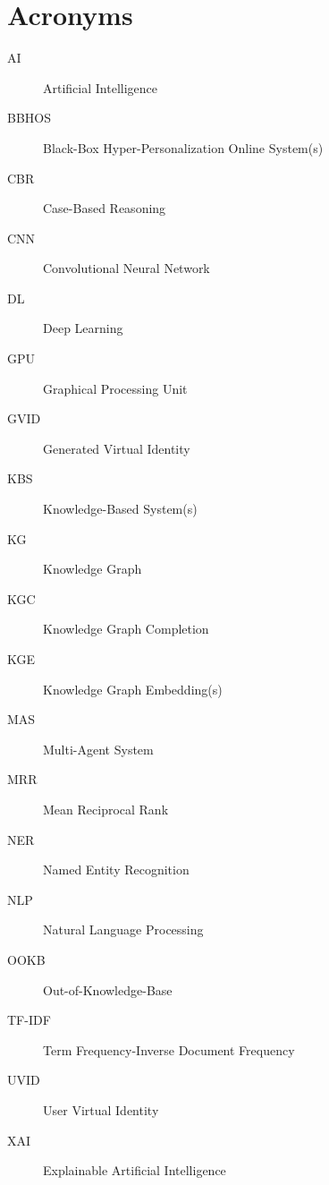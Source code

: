 

\chapter{Acronyms}
\begin{description}
\item[AI]{Artificial Intelligence}
\item[BBHOS]{Black-Box Hyper-Personalization Online System(s)}
\item[CBR]{Case-Based Reasoning}
\item[CNN]{Convolutional Neural Network}
\item[DL]{Deep Learning}
\item[GPU]{Graphical Processing Unit}
\item[GVID]{Generated Virtual Identity}
\item[KBS]{Knowledge-Based System(s)}
\item[KG]{Knowledge Graph}
\item[KGC]{Knowledge Graph Completion}
\item[KGE]{Knowledge Graph Embedding(s)}
\item[MAS]{Multi-Agent System}
\item[MRR]{Mean Reciprocal Rank}
\item[NER]{Named Entity Recognition}
\item[NLP]{Natural Language Processing}
\item[OOKB]{Out-of-Knowledge-Base}
\item[TF-IDF]{Term Frequency-Inverse Document Frequency}
\item[UVID]{User Virtual Identity}
\item[XAI]{Explainable Artificial Intelligence}

\end{description}

